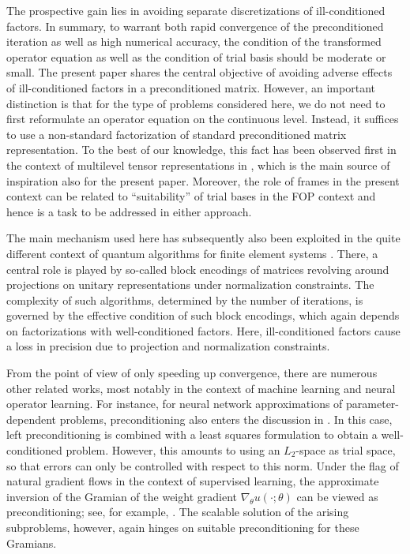 \documentclass[a4paper,11pt]{amsart}
\numberwithin{equation}{section}
\theoremstyle{definition}
\theoremstyle{remark}
\theoremstyle{plain}
\begin{document}
The prospective gain lies in avoiding separate discretizations of ill-conditioned factors.
In summary, to warrant both rapid convergence of the preconditioned iteration as well as high numerical accuracy, the condition of the transformed operator equation as well as the condition of
trial basis should be moderate or small. The present paper shares the central objective of avoiding adverse effects of ill-conditioned factors in a preconditioned matrix. 
However, an important distinction is that for the type
of problems considered here, we do not need to first reformulate an operator equation
on the continuous level. 
Instead, it suffices to use a non-standard factorization of standard preconditioned matrix representation. To the best of our knowledge, this fact has been observed first in the 
context  of multilevel tensor representations   in \cite{BK20}, which is the main source of inspiration also for the present paper. 
Moreover, the role of frames in the present context can be related to ``suitability'' of trial bases in the FOP context and hence is a 
task to be addressed in either approach.  

The main mechanism used here has subsequently also been exploited in the quite different context 
of quantum algorithms for finite element systems \cite{DP25}. There, a central role is played by so-called block encodings of matrices revolving around projections on unitary representations under normalization constraints. The complexity of such algorithms, determined by the number of iterations,   is  governed by
the effective condition of such block encodings, which again depends on factorizations with
well-conditioned factors. Here, ill-conditioned factors cause a loss in precision due to projection and normalization constraints.

From the point of view of only speeding up convergence, there are numerous other
related works, most notably in the context of machine learning and neural operator learning.
For instance, for neural network approximations of parameter-dependent problems, preconditioning also enters the discussion in \cite{GHRK:25}. In this case, left preconditioning is combined with a least squares formulation to obtain a well-conditioned problem. However, this amounts to using an $L_2$-space as trial space, so that errors can only be controlled with respect to this norm.
Under the flag of natural gradient flows in the context of supervised learning, the approximate inversion of the Gramian of the weight gradient $\nabla_\theta u(\cdot;\theta)$
can be viewed as preconditioning; see, for example, \cite{Cayci,Wuchen,Peher1,DLTW2025}. The scalable solution of the arising subproblems, however, again hinges on suitable preconditioning for these Gramians.
\end{document}
